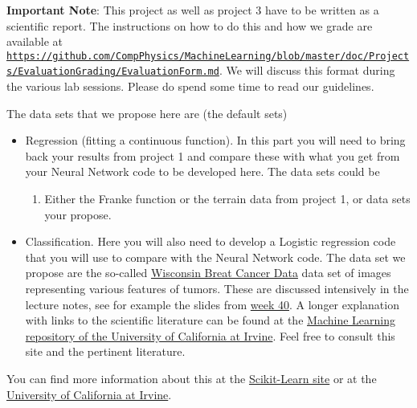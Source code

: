 \documentclass[%
oneside,                 %
final,                   %
10pt]{article}
\begin{document}
\textbf{Important Note}: This project as well as project 3 have to be written as a scientific report. The instructions on how to do this and how we grade are available at \href{{https://github.com/CompPhysics/MachineLearning/blob/master/doc/Projects/EvaluationGrading/EvaluationForm.md}}{\nolinkurl{https://github.com/CompPhysics/MachineLearning/blob/master/doc/Projects/EvaluationGrading/EvaluationForm.md}}. We will discuss this format during the various lab sessions. Please do spend some time to read our guidelines.

The data sets that we propose here are (the default sets)

\begin{itemize}
\item Regression (fitting a continuous function). In this part you will need to bring back your results from project 1 and compare these with what you get from your Neural Network code to be developed here. The data sets could be
\begin{enumerate}

 \item Either the Franke function or the terrain data from project 1, or data sets your propose.

\end{enumerate}

\noindent
\item Classification. Here you will also need to develop a Logistic regression code that you will use to compare with the Neural Network code. The data set we propose are the so-called \href{{https://www.kaggle.com/uciml/breast-cancer-wisconsin-data}}{Wisconsin Breat Cancer Data} data set of images representing various features of tumors. These are discussed intensively in the lecture notes, see for example the slides from \href{{https://compphysics.github.io/MachineLearning/doc/pub/week41/html/week40.html}}{week 40}. A longer explanation with links to the scientific literature can be found at the \href{{https://archive.ics.uci.edu/ml/datasets/Breast+Cancer+Wisconsin+%
\end{itemize}

\noindent
You can find more information about this at the \href{{https://scikit-learn.org/stable/modules/generated/sklearn.datasets.load_breast_cancer.html}}{Scikit-Learn site} or at the \href{{https://archive.ics.uci.edu/ml/datasets/breast+cancer+wisconsin+(original)}}{University of California at Irvine}. 
\end{document}
